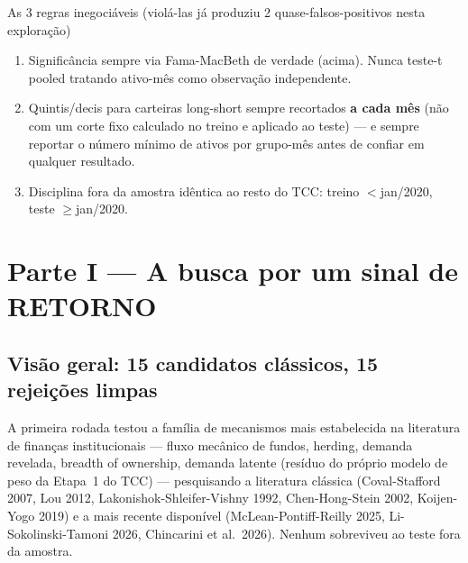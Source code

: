 \documentclass[11pt,a4paper]{article}
\begin{document}
\begin{licao}{As 3 regras inegociáveis (violá-las já produziu 2 quase-falsos-positivos nesta exploração)}
\begin{enumerate}
\item Significância sempre via Fama-MacBeth de verdade (acima). Nunca teste-t pooled tratando ativo-mês como observação independente.
\item Quintis/decis para carteiras long-short sempre recortados \textbf{a cada mês} (não com um corte fixo calculado no treino e aplicado ao teste) --- e sempre reportar o número mínimo de ativos por grupo-mês antes de confiar em qualquer resultado.
\item Disciplina fora da amostra idêntica ao resto do TCC: treino $<$jan/2020, teste $\geq$jan/2020.
\end{enumerate}
\end{licao}

\section{Parte I --- A busca por um sinal de RETORNO}
\label{sec:retorno}

\subsection{Visão geral: 15 candidatos clássicos, 15 rejeições limpas}

A primeira rodada testou a família de mecanismos mais estabelecida na
literatura de finanças institucionais --- fluxo mecânico de fundos, herding,
demanda revelada, breadth of ownership, demanda latente (resíduo do
próprio modelo de peso da Etapa~1 do TCC) --- pesquisando a literatura
clássica (Coval-Stafford 2007, Lou 2012, Lakonishok-Shleifer-Vishny 1992,
Chen-Hong-Stein 2002, Koijen-Yogo 2019) e a mais recente disponível
(McLean-Pontiff-Reilly 2025, Li-Sokolinski-Tamoni 2026, Chincarini et al.\
2026). Nenhum sobreviveu ao teste fora da amostra.
\end{document}
